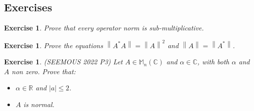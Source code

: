 \documentclass[12pt]{article}
\newcommand{\norm}[1]{\left\lVert #1 \right\rVert}
\theoremstyle{definition}
\theoremstyle{remark}
\theoremstyle{plain}
\newtheorem{ex}[subsubsection]{Exercise}
\begin{document}
\subsection{Exercises}
\begin{ex}
    Prove that every operator norm is sub-multiplicative.
\end{ex}
\begin{ex}
    Prove the equations $\norm{A^*A}=\norm{A}^2$ and $\norm{A}=\norm{A^*}$.
\end{ex}
\begin{ex}\textup{(SEEMOUS 2022 P3)}
Let $A\in \mathbb{M}_n(\mathbb{C})$ and $\alpha\in \mathbb{C}$, with both $\alpha$ and $A$ non zero. Prove that: \begin{itemize}
    \item $\alpha\in \mathbb{R}$ and $|a|\leq 2$.
    \item $A$ is normal.
\end{itemize}
\end{ex}
\newpage
\end{document}
